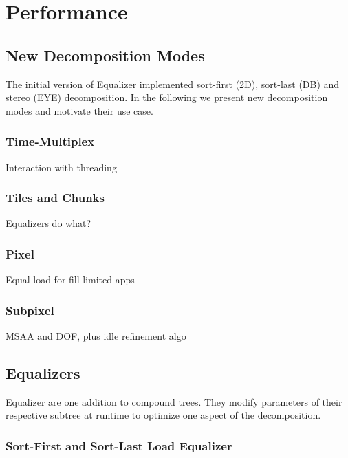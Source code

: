 \documentclass[journal]{vgtc}                %
\begin{document}
\section{Performance}

\subsection{New Decomposition Modes}

The initial version of Equalizer implemented sort-first (2D), sort-last (DB) and
stereo (EYE) decomposition. In the following we present new decomposition modes
and motivate their use case.

\subsubsection{Time-Multiplex}

Interaction with threading

\subsubsection{Tiles and Chunks}

Equalizers do what?

\subsubsection{Pixel}

Equal load for fill-limited apps

\subsubsection{Subpixel}

MSAA and DOF, plus idle refinement algo

\subsection{Equalizers}

Equalizer are one addition to compound trees. They modify parameters of their
respective subtree at runtime to optimize one aspect of the decomposition.

\subsubsection{Sort-First and Sort-Last Load Equalizer}
\end{document}
